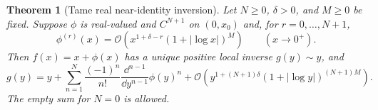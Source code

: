 \documentclass[11pt,a4paper]{article}
\numberwithin{equation}{section}
\newtheorem{theorem}{Theorem}[section]
\theoremstyle{definition}\newtheorem{definition}[theorem]{Definition}
\theoremstyle{remark}\newtheorem{remark}[theorem]{Remark}
\newcommand{\OO}{\mathcal O}\newcommand{\Id}{\mathrm{id}}
\begin{document}
\begin{theorem}[Tame real near-identity inversion]\label{thm:smooth}
Let $N\ge0$, $\delta>0$, and $M\ge0$ be fixed. Suppose $\phi$ is real-valued and $C^{N+1}$ on $(0,x_0)$ and, for $r=0,\ldots,N+1$,
\begin{equation}\label{eq:derivativehyp}
\phi^{(r)}(x)=\OO\!\left(x^{1+\delta-r}
 (1+|\log x|)^M\right)\qquad(x\to0^+).
\end{equation}
Then $f(x)=x+\phi(x)$ has a unique positive local inverse $g(y)\sim y$, and
\begin{equation}\label{eq:smoothLB}
g(y)=y+\sum_{n=1}^{N}\frac{(-1)^n}{n!}
 \frac{\dd^{n-1}}{\dd y^{n-1}}\phi(y)^n
 +\OO\!\left(y^{1+(N+1)\delta}
 (1+|\log y|)^{(N+1)M}\right).
\end{equation}
The empty sum for $N=0$ is allowed.
\end{theorem}
\end{document}
